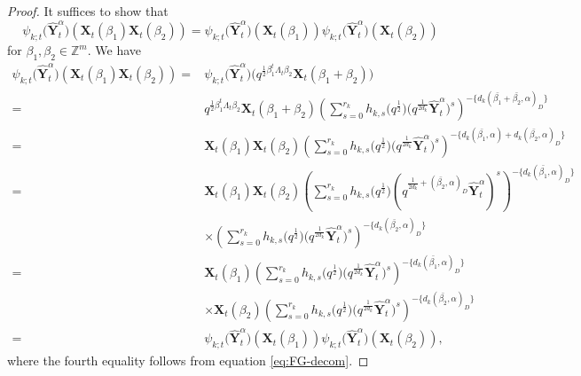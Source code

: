 \documentclass[pdftex]{sigma}
\numberwithin{equation}{section}
\begin{document}
 \begin{proof}
It suffices to show that
 \[\psi_{k;t}\bigl(\mathbf{\hat{Y}}_{t}^{\alpha}\bigr)(\mathbf{X}_{t}(\beta_1)\mathbf{X}_{t}(\beta_2))=\psi_{k;t}\bigl(\mathbf{\hat{Y}}_{t}^{\alpha}\bigr)(\mathbf{X}_{t}(\beta_1))\psi_{k;t}\bigl(\mathbf{\hat{Y}}_{t}^{\alpha}\bigr)(\mathbf{X}_{t}(\beta_2))\]
for $\beta_{1},\beta_2\in\mathbb{Z}^{m}$. We have
\begin{align*}
 \psi_{k;t}\bigl(\mathbf{\hat{Y}}_{t}^{\alpha}\bigr)(\mathbf{X}_{t}(\beta_1)\mathbf{X}_{t}(\beta_2))
 ={}&\psi_{k;t}\bigl(\mathbf{\hat{Y}}_{t}^{\alpha}\bigr)\bigl(q^{\frac{1}{2}\beta_{1}^{t}\Lambda_{t}\beta_{2}}\mathbf{X}_{t}(\beta_1+\beta_2)\bigr)\\
 ={}&q^{\frac{1}{2}\beta_{1}^{t}\Lambda_{t}\beta_{2}}\mathbf{X}_{t}(\beta_{1}+\beta_{2})\left(\sum\limits_{s=0}^{r_k} h_{k,s}\bigl(q^{\frac{1}{2}}\bigr)\bigl(q^{\frac{1}{2d_{k}}}\mathbf{\hat{Y}}_{t}^{\alpha}\bigr)^{s}\right)^{-\{d_{k}(\bar{\beta_{1}}+\bar{\beta_{2}},\alpha)_D\}}\\
 ={}&\mathbf{X}_{t}(\beta_{1})\mathbf{X}_{t}(\beta_{2})\left(\sum\limits_{s=0}^{r_k} h_{k,s}\bigl(q^{\frac{1}{2}}\bigr)\bigl(q^{\frac{1}{2d_{k}}}\mathbf{\hat{Y}}_{t}^{\alpha}\bigr)^{s}\right)^{-\{d_{k}(\bar{\beta_{1}},\alpha)+d_k(\bar{\beta_{2}},\alpha)_D\}}\\
={}&\mathbf{X}_{t}(\beta_{1})\mathbf{X}_{t}(\beta_{2})\left(\sum\limits_{s=0}^{r_k} h_{k,s}\bigl(q^{\frac{1}{2}}\bigr)(q^{\frac{1}{2d_{k}}+ (\bar{\beta_{2}},\alpha)_D}\mathbf{\hat{Y}}_{t}^{\alpha})^{s}\right)^{-\{d_{k}(\bar{\beta_{1}},\alpha)_D\}}\\
&\times\left(\sum\limits_{s=0}^{r_k} h_{k,s}\bigl(q^{\frac{1}{2}}\bigr)\bigl(q^{\frac{1}{2d_{k}}}\mathbf{\hat{Y}}_{t}^{\alpha}\bigr)^{s}\right)^{-\{d_{k}(\bar{\beta_{2}},\alpha)_D\}}\\
={}&\mathbf{X}_{t}(\beta_{1})\left(\sum\limits_{s=0}^{r_k} h_{k,s}\bigl(q^{\frac{1}{2}}\bigr)\bigl(q^{\frac{1}{2d_{k}}}\mathbf{\hat{Y}}_{t}^{\alpha}\bigr)^{s}\right)^{-\{d_{k}(\bar{\beta_{1}},\alpha)_D\}}\\
&\times\mathbf{X}_{t}(\beta_{2})\left(\sum\limits_{s=0}^{r_k} h_{k,s}\bigl(q^{\frac{1}{2}}\bigr)\bigl(q^{\frac{1}{2d_{k}}}\mathbf{\hat{Y}}_{t}^{\alpha}\bigr)^{s}\right)^{-\{d_{k}(\bar{\beta_{2}},\alpha)_D\}}\\
={}&\psi_{k;t}\bigl(\mathbf{\hat{Y}}_{t}^{\alpha}\bigr)(\mathbf{X}_{t}(\beta_1))\psi_{k;t}\bigl(\mathbf{\hat{Y}}_{t}^{\alpha}\bigr)(\mathbf{X}_{t}(\beta_2)),
\end{align*}
where the fourth equality follows from equation \eqref{eq:FG-decom}.
\end{proof}
\end{document}
